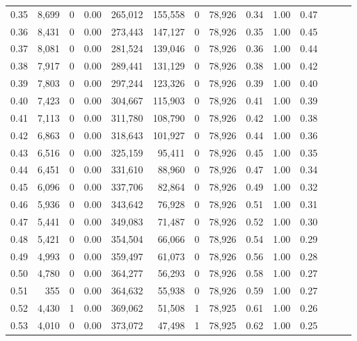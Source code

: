 \begin{tabular}{rrrrrrrrrrrrrr}
0.35 &  8,699 &      0 &  0.00 &  265,012 &  155,558 &       0 &  78,926 &  0.34 &  1.00 &      0.47 \\
0.36 &  8,431 &      0 &  0.00 &  273,443 &  147,127 &       0 &  78,926 &  0.35 &  1.00 &      0.45 \\
0.37 &  8,081 &      0 &  0.00 &  281,524 &  139,046 &       0 &  78,926 &  0.36 &  1.00 &      0.44 \\
0.38 &  7,917 &      0 &  0.00 &  289,441 &  131,129 &       0 &  78,926 &  0.38 &  1.00 &      0.42 \\
0.39 &  7,803 &      0 &  0.00 &  297,244 &  123,326 &       0 &  78,926 &  0.39 &  1.00 &      0.40 \\
0.40 &  7,423 &      0 &  0.00 &  304,667 &  115,903 &       0 &  78,926 &  0.41 &  1.00 &      0.39 \\
0.41 &  7,113 &      0 &  0.00 &  311,780 &  108,790 &       0 &  78,926 &  0.42 &  1.00 &      0.38 \\
0.42 &  6,863 &      0 &  0.00 &  318,643 &  101,927 &       0 &  78,926 &  0.44 &  1.00 &      0.36 \\
0.43 &  6,516 &      0 &  0.00 &  325,159 &   95,411 &       0 &  78,926 &  0.45 &  1.00 &      0.35 \\
0.44 &  6,451 &      0 &  0.00 &  331,610 &   88,960 &       0 &  78,926 &  0.47 &  1.00 &      0.34 \\
0.45 &  6,096 &      0 &  0.00 &  337,706 &   82,864 &       0 &  78,926 &  0.49 &  1.00 &      0.32 \\
0.46 &  5,936 &      0 &  0.00 &  343,642 &   76,928 &       0 &  78,926 &  0.51 &  1.00 &      0.31 \\
0.47 &  5,441 &      0 &  0.00 &  349,083 &   71,487 &       0 &  78,926 &  0.52 &  1.00 &      0.30 \\
0.48 &  5,421 &      0 &  0.00 &  354,504 &   66,066 &       0 &  78,926 &  0.54 &  1.00 &      0.29 \\
0.49 &  4,993 &      0 &  0.00 &  359,497 &   61,073 &       0 &  78,926 &  0.56 &  1.00 &      0.28 \\
0.50 &  4,780 &      0 &  0.00 &  364,277 &   56,293 &       0 &  78,926 &  0.58 &  1.00 &      0.27 \\
0.51 &    355 &      0 &  0.00 &  364,632 &   55,938 &       0 &  78,926 &  0.59 &  1.00 &      0.27 \\
0.52 &  4,430 &      1 &  0.00 &  369,062 &   51,508 &       1 &  78,925 &  0.61 &  1.00 &      0.26 \\
0.53 &  4,010 &      0 &  0.00 &  373,072 &   47,498 &       1 &  78,925 &  0.62 &  1.00 &      0.25 \\

\end{tabular}
